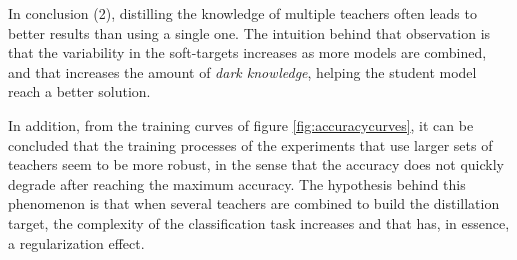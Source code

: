  In conclusion (2), distilling the knowledge of multiple teachers often leads to better results than using a single one.  The intuition behind that observation is that the variability in the soft-targets increases as more models are combined, and that increases the amount of \textit{dark knowledge}, helping the student model reach a better solution. 
 
 In addition, from the training curves of figure \ref{fig:accuracycurves}, it can be concluded that the training processes of the experiments that use larger sets of teachers seem to be more robust, in the sense that the accuracy does not quickly degrade after reaching the maximum accuracy. The hypothesis behind this phenomenon is that when several teachers are combined to build the distillation target, the complexity of the classification task increases and that has, in essence, a regularization effect.
 
